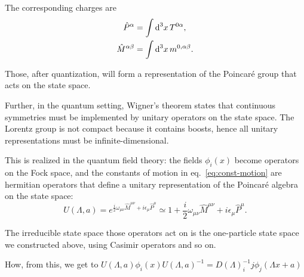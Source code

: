The corresponding charges are
\begin{subequations}\label{eq:const-motion}
\begin{align}
    \hat{P}^\alpha &= \int {\mathop{}\!\mathrm{d}}^3 x \, T^{0\alpha} , \\
   \hat{M}^{\alpha\beta} &= \int {\mathop{}\!\mathrm{d}}^3 x \, m^{0 ,\alpha\beta} .
\end{align}
\end{subequations}

Those, after quantization, will form a representation of the Poincaré group that acts on the state space.

Further, in the quantum setting, Wigner's theorem states that continuous symmetries must be implemented by unitary operators on the state space. The Lorentz group is not compact because it contains boosts, hence all unitary representations must be infinite-dimensional. 

This is realized in the quantum field theory: the fields $\phi_i(x)$ become operators on the Fock space, and the constants of motion in eq.~\eqref{eq:const-motion} are hermitian operators that define a unitary representation of the Poincaré algebra on the state space:
\begin{equation}
    U(\Lambda,a) = e^{\frac{i}{2} \omega_{\mu\nu} \hat{M}^{\mu\nu} + i \epsilon_\mu \hat{P}^\mu} \simeq 1 + \frac{i}{2} \omega_{\mu\nu} \hat{M}^{\mu\nu} + i \epsilon_\mu \hat{P}^\mu .
\end{equation}

The irreducible state space those operators act on is the one-particle state space we constructed above, using Casimir operators and so on.

\color{red} How, from this, we get to $U(\Lambda,a) \phi_i(x) U(\Lambda,a)^{-1} = D(\Lambda)^{-1}_ij \phi_j (\Lambda x + a)$
\color{black}